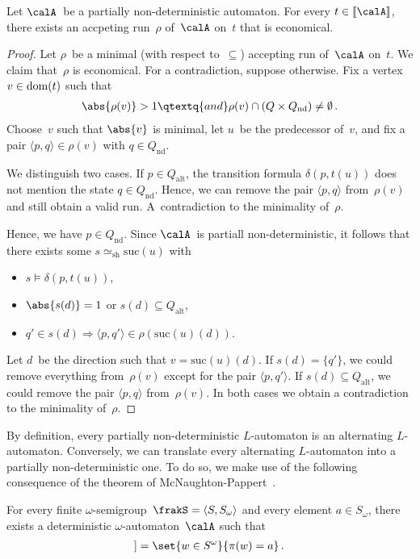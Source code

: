 \documentclass[10pt, fleqn]{scrartcl}
\DeclareRobustCommand*{\dom}{\qopname\relax o{dom}}
\newcommand*{\sh}{\mathrm{sh}}
\newcommand*{\suc}{\mathrm{suc}}
\newcommand*{\?}{\kern .08em}
\newcommand\lsem{[\![}
\newcommand\rsem{]\!]}
\begin{document}
\begin{Lem}
Let $\calA$~be a partially non-deterministic automaton. For every $t \in \lsem\calA\rsem$,
there exists an accpeting run~$\rho$ of~$\calA$ on~$t$ that is economical.
\end{Lem}
\begin{proof}
Let $\rho$~be a minimal (with respect to~$\subseteq$) accepting run of~$\calA$ on~$t$.
We claim that~$\rho$ is economical.
For a contradiction, suppose otherwise. Fix a vertex $v \in \dom(t)$ such that
\begin{align*}
  \abs{\rho(v)} > 1 \qtextq{and} \rho(v) \cap (Q \times Q_{\mathrm{nd}}) \neq \emptyset\,.
\end{align*}
Choose~$v$ such that $\abs{v}$ is minimal, let $u$~be the predecessor of~$v$, and fix
a pair $\langle p,q\rangle \in \rho(v)$ with $q \in Q_{\mathrm{nd}}$.

We distinguish two cases.
If $p \in Q_{\mathrm{alt}}$, the transition formula $\delta(p,t(u))$ does not mention
the state $q \in Q_{\mathrm{nd}}$. Hence, we can remove the pair $\langle p,q\rangle$
from~$\rho(v)$ and still obtain a valid run. A~contradiction to the minimality of~$\rho$.

Hence, we have $p \in Q_{\mathrm{nd}}$.
Since $\calA$~is partiall non-deterministic, it follows that there exists some
$s \simeq_\sh \suc(u)$ with
\begin{itemize}
\item $s \models \delta(p,t(u))$,
\item $\abs{s(d)} = 1$ or $s(d) \subseteq Q_{\mathrm{alt}}$,
\item $q' \in s(d) \Rightarrow \langle p,q'\rangle \in \rho(\suc(u)(d))$.
\end{itemize}
Let $d$~be the direction such that $v = \suc(u)(d)$.
If $s(d) = \{q'\}$, we could remove everything from~$\rho(v)$ except for the pair
$\langle p,q'\rangle$.
If $s(d) \subseteq Q_{\mathrm{alt}}$, we could remove the pair $\langle p,q\rangle$
from~$\rho(v)$. In both cases we obtain a contradiction to the minimality of~$\rho$.
\end{proof}

By definition, every partially non-deterministic $L$-automaton is an alternating $L$-automaton.
Conversely, we can translate every alternating $L$-automaton into a partially non-deterministic
one.
To do so, we make use of the following consequence of the theorem of
McNaughton-Pappert~\cite{McNaughton66}.
\begin{Prop}\label{Prop: deterministic automaton for omega-semigroup}
For every finite $\omega$-semigroup\/~$\frakS = \langle S,S_\omega\rangle$ and every element
$a \in S_\omega$, there exists a deterministic $\omega$-automaton~$\calA$ such that
\begin{align*}
  \lsem\calA\rsem = \set{ w \in S^\omega }{ \pi(w) = a }\,.
\end{align*}
\end{Prop}
\end{document}
